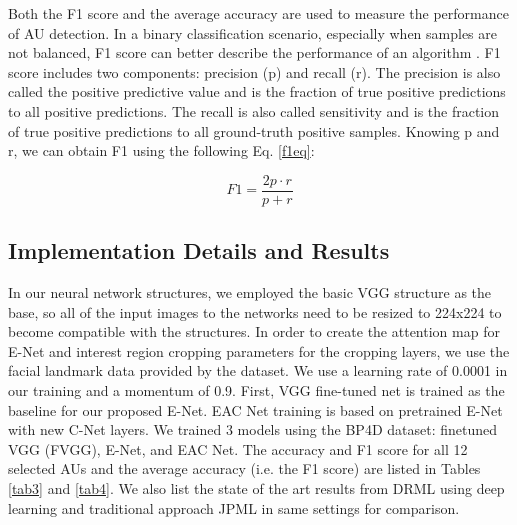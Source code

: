 \documentclass[a4paper, 10pt, conference]{ieeeconf}      %
\begin{document}
{\color {black} Both the F1 score and the average accuracy are used to measure the performance of AU detection. In a binary classification scenario, especially when samples are not balanced, F1 score can better describe the performance of an algorithm \cite{p9,p10}. F1 score includes two components: precision (p) and recall (r). The precision is also called the positive predictive value and is the fraction of true positive predictions to all positive predictions. The recall is also called sensitivity and is the fraction of true positive predictions to all ground-truth positive samples.  Knowing p and r, we can obtain F1 using the following Eq. \ref{f1eq}}:

\begin{equation}
\label{f1eq}
F1=\frac{2p\cdot r}{p+r}
\end{equation}

\subsection{Implementation Details and Results}
In our neural network structures, we employed the basic VGG structure as the base, so all of the input images to the networks need to be resized to 224x224 to become compatible with the structures. In order to create the attention map for E-Net and interest region cropping parameters for the cropping layers, we use the facial landmark data provided by the dataset. We use a learning rate of 0.0001 in our training and a momentum of 0.9. First, VGG fine-tuned net is trained as the baseline for our proposed E-Net. EAC Net training is based on pretrained E-Net with new C-Net layers.
We trained 3 models using the BP4D dataset: finetuned VGG (FVGG), E-Net, and EAC Net. The accuracy and F1 score for all 12 selected AUs and the average accuracy (i.e. the F1 score) are listed in Tables \ref{tab3} and \ref{tab4}. We also list the state of the art results from DRML \cite{p22} using deep learning and traditional approach JPML \cite{p13} in same settings for comparison.
\end{document}
